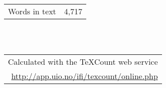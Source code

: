 \documentclass[a4paper,twoside,notitlepage,11pt]{article}
\begin{document}






\null
\vfill
\begin{flushright}
	\begin{tabular}{r|l}
		Words in text	& 4,717 \\
	\end{tabular}
	\ \\
	\ \\
	\begin{tabular}{cc}
		\multicolumn{2}{r}{Calculated with the TeXCount web service}\\
		\multicolumn{2}{r}{\url{http://app.uio.no/ifi/texcount/online.php}}
	\end{tabular}
\end{flushright}

%
%
%
%

\newpage
\pagestyle{biblio}





%
%
% 
%
\newpage
\setcounter{page}{1}
\pagestyle{appendix}
\appendix



%
%
%
%
\end{document}
